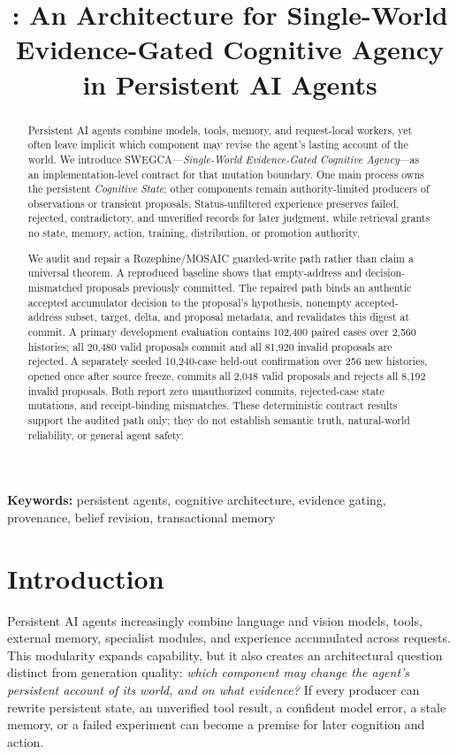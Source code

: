 \documentclass[10pt]{article}
\title{\swegca: An Architecture for Single-World Evidence-Gated Cognitive Agency in Persistent AI Agents}
\author{}
\date{}
\newcommand{\swegca}{\textsc{SWEGCA}}
\newcommand{\cstate}{\textit{Cognitive State}}
\begin{document}
\maketitle

\begin{abstract}
Persistent AI agents combine models, tools, memory, and request-local workers, yet often leave implicit which component may revise the agent's lasting account of the world. We introduce \swegca---\emph{Single-World Evidence-Gated Cognitive Agency}---as an implementation-level contract for that mutation boundary. One main process owns the persistent \cstate; other components remain authority-limited producers of observations or transient proposals. Status-unfiltered experience preserves failed, rejected, contradictory, and unverified records for later judgment, while retrieval grants no state, memory, action, training, distribution, or promotion authority.

We audit and repair a Rozephine/MOSAIC guarded-write path rather than claim a universal theorem. A reproduced baseline shows that empty-address and decision-mismatched proposals previously committed. The repaired path binds an authentic accepted accumulator decision to the proposal's hypothesis, nonempty accepted-address subset, target, delta, and proposal metadata, and revalidates this digest at commit. A primary development evaluation contains 102,400 paired cases over 2,560 histories; all 20,480 valid proposals commit and all 81,920 invalid proposals are rejected. A separately seeded 10,240-case held-out confirmation over 256 new histories, opened once after source freeze, commits all 2,048 valid proposals and rejects all 8,192 invalid proposals. Both report zero unauthorized commits, rejected-case state mutations, and receipt-binding mismatches. These deterministic contract results support the audited path only; they do not establish semantic truth, natural-world reliability, or general agent safety.
\end{abstract}

\noindent\textbf{Keywords:} persistent agents, cognitive architecture, evidence gating, provenance, belief revision, transactional memory

\section{Introduction}

Persistent AI agents increasingly combine language and vision models, tools, external memory, specialist modules, and experience accumulated across requests. This modularity expands capability, but it also creates an architectural question distinct from generation quality: \emph{which component may change the agent's persistent account of its world, and on what evidence?} If every producer can rewrite persistent state, an unverified tool result, a confident model error, a stale memory, or a failed experiment can become a premise for later cognition and action.
\end{document}
